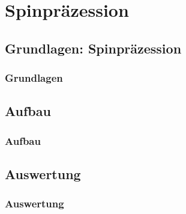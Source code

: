 \section{Spinpräzession}
\subsection{Grundlagen: Spinpräzession}
\begin{frame}
\frametitle{Grundlagen}
  
\end{frame}

\subsection{Aufbau}
\begin{frame}
\frametitle{Aufbau}
  
\end{frame}

\subsection{Auswertung}
\begin{frame}
\frametitle{Auswertung}
  
\end{frame}